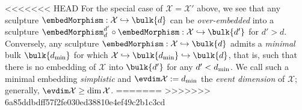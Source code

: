 <<<<<<< HEAD
    For the special case of $\mathcal{X} = \mathcal{X}'$ above, we see that any sculpture $\embedMorphism: \mathcal{X} \hookrightarrow \bulk{d}$ can be \emph{over-embedded} into a sculpture $\embedMorphism_d^{d'}\circ \embedMorphism: \mathcal{X} \hookrightarrow \bulk{d'}$ for $d'> d$.  Conversely, any sculpture $\embedMorphism: \mathcal{X} \hookrightarrow \bulk{d}$ admits a \emph{minimal} bulk $\bulk{d_\textup{min}}$ for which $\mathcal{X} \hookrightarrow \bulk{d_\textup{min}}\hookrightarrow \bulk{d}$, that is, such that there is no embedding of $\mathcal{X}$ into $\bulk{d'}$ for any $d'< d_\textup{min}$.  We call such a minimal embedding \emph{simplistic} and $\evdim \mathcal{X} := d_\textup{min}$ the \emph{event dimension} of $\mathcal{X}$; generally, $\evdim \mathcal{X} \ge \dim \mathcal{X}$.
=======
>>>>>>> 6a85ddbdff57f2fe030ed38810e4ef49c2b1c3cd



